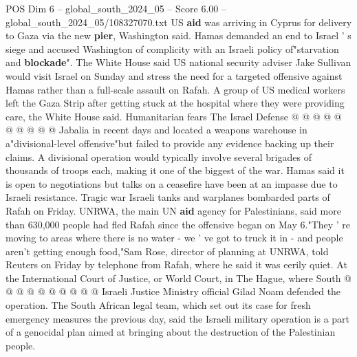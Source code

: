 \begin{textsample}{POS Dim 6 – global\_south\_2024\_05 – Score 6.00 – global\_south\_2024\_05/108327070.txt}
US \textbf{aid} was arriving in Cyprus for delivery to Gaza via the new \textbf{pier}, Washington said.
Hamas demanded an end to Israel ' s siege and accused Washington of complicity with an Israeli policy of"starvation and \textbf{blockade}".
The White House said US national security adviser Jake Sullivan would visit Israel on Sunday and stress the need for a targeted offensive against Hamas rather than a full-scale assault on Rafah.
A group of US medical workers left the Gaza Strip after getting stuck at the hospital where they were providing care, the White House said.
Humanitarian fears The Israel Defense @ @ @ @ @ @ @ @ @ @ Jabalia in recent days and located a weapons warehouse in a"divisional-level offensive"but failed to provide any evidence backing up their claims.
A divisional operation would typically involve several brigades of thousands of troops each, making it one of the biggest of the war.
Hamas said it is open to negotiations but talks on a ceasefire have been at an impasse due to Israeli resistance.
Tragic war Israeli tanks and warplanes bombarded parts of Rafah on Friday.
UNRWA, the main UN \textbf{aid} agency for Palestinians, said more than 630,000 people had fled Rafah since the offensive began on May 6."They ' re moving to areas where there is no water - we ' ve got to truck it in - and people aren't getting enough food,"Sam Rose, director of planning at UNRWA, told Reuters on Friday by telephone from Rafah, where he said it was eerily quiet.
At the International Court of Justice, or World Court, in The Hague, where South @ @ @ @ @ @ @ @ @ @ Israeli Justice Ministry official Gilad Noam defended the operation.
The South African legal team, which set out its case for fresh emergency measures the previous day, said the Israeli military operation is a part of a genocidal plan aimed at bringing about the destruction of the Palestinian people.

\end{textsample}
